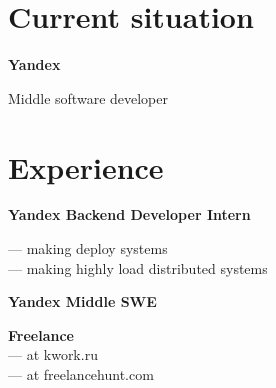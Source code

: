 \documentclass[a4paper,6pt]{article}
\begin{document}
%
\hfill
\begin{adjustbox}{valign=t}
\begin{minipage}{0.05\textwidth} %
\MyVerticalRule  %
\end{minipage}
\end{adjustbox}
\hfill
%
\begin{adjustbox}{valign=t}
\begin{minipage}{0.6\textwidth} %
\section*{Current situation}
\begin{description}
\raggedright
\item[\normalfont \textcolor{ColorOne}{March 2022 -- ...}] \textbf{Yandex}\\ \medskip

Middle software developer

\end{description}

\section*{Experience}
\begin{description}
\raggedright
\item[\normalfont \textcolor{ColorOne}{2021}] 
	\textbf{Yandex
Backend Developer Intern}\\ \medskip
	
	--- making deploy systems \\
	--- making highly load distributed systems

\item[\normalfont \textcolor{ColorOne}{March 2022 -- ...}] 
	\textbf{Yandex
Middle SWE}\\ \medskip
	
\item[\normalfont \textcolor{ColorOne}{Aug. 2019 -- Aug. 2021.}] 
	\textbf{Freelance}\\ \medskip
	---  at kwork.ru \\
	---  at freelancehunt.com


\end{description}
\end{minipage}
\end{adjustbox}
\end{document}

